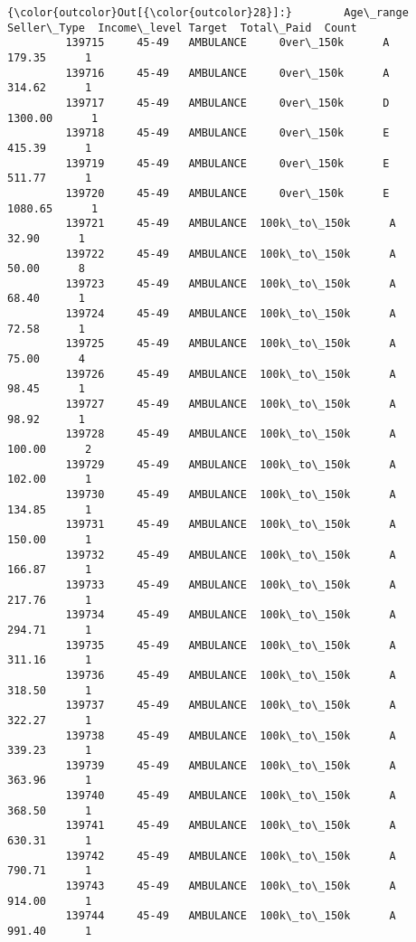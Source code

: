\documentclass[11pt]{article}
\begin{document}
\begin{Verbatim}[commandchars=\\\{\}]
{\color{outcolor}Out[{\color{outcolor}28}]:}        Age\_range Seller\_Type  Income\_level Target  Total\_Paid  Count
         139715     45-49   AMBULANCE     0ver\_150k      A      179.35      1
         139716     45-49   AMBULANCE     0ver\_150k      A      314.62      1
         139717     45-49   AMBULANCE     0ver\_150k      D     1300.00      1
         139718     45-49   AMBULANCE     0ver\_150k      E      415.39      1
         139719     45-49   AMBULANCE     0ver\_150k      E      511.77      1
         139720     45-49   AMBULANCE     0ver\_150k      E     1080.65      1
         139721     45-49   AMBULANCE  100k\_to\_150k      A       32.90      1
         139722     45-49   AMBULANCE  100k\_to\_150k      A       50.00      8
         139723     45-49   AMBULANCE  100k\_to\_150k      A       68.40      1
         139724     45-49   AMBULANCE  100k\_to\_150k      A       72.58      1
         139725     45-49   AMBULANCE  100k\_to\_150k      A       75.00      4
         139726     45-49   AMBULANCE  100k\_to\_150k      A       98.45      1
         139727     45-49   AMBULANCE  100k\_to\_150k      A       98.92      1
         139728     45-49   AMBULANCE  100k\_to\_150k      A      100.00      2
         139729     45-49   AMBULANCE  100k\_to\_150k      A      102.00      1
         139730     45-49   AMBULANCE  100k\_to\_150k      A      134.85      1
         139731     45-49   AMBULANCE  100k\_to\_150k      A      150.00      1
         139732     45-49   AMBULANCE  100k\_to\_150k      A      166.87      1
         139733     45-49   AMBULANCE  100k\_to\_150k      A      217.76      1
         139734     45-49   AMBULANCE  100k\_to\_150k      A      294.71      1
         139735     45-49   AMBULANCE  100k\_to\_150k      A      311.16      1
         139736     45-49   AMBULANCE  100k\_to\_150k      A      318.50      1
         139737     45-49   AMBULANCE  100k\_to\_150k      A      322.27      1
         139738     45-49   AMBULANCE  100k\_to\_150k      A      339.23      1
         139739     45-49   AMBULANCE  100k\_to\_150k      A      363.96      1
         139740     45-49   AMBULANCE  100k\_to\_150k      A      368.50      1
         139741     45-49   AMBULANCE  100k\_to\_150k      A      630.31      1
         139742     45-49   AMBULANCE  100k\_to\_150k      A      790.71      1
         139743     45-49   AMBULANCE  100k\_to\_150k      A      914.00      1
         139744     45-49   AMBULANCE  100k\_to\_150k      A      991.40      1

\end{Verbatim}
\end{document}
